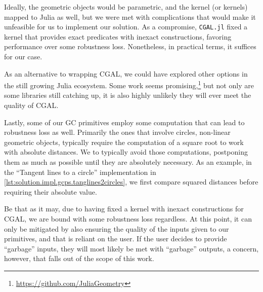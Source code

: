 Ideally, the geometric objects would be parametric, and the kernel (or kernels)
mapped to Julia as well, but we were met with complications that would make it
unfeasible for us to implement our solution.  As a compromise, \texttt{CGAL.jl}
fixed a kernel that provides exact predicates with inexact constructions,
favoring performance over some robustness loss.  Nonetheless, in practical
terms, it suffices for our case.

As an alternative to wrapping \ac{CGAL}, we could have explored other options in
the still growing Julia ecosystem.  Some work seems
promising,\footnote{\url{https://github.com/JuliaGeometry}} but not only are
some libraries still catching up, it is also highly unlikely they will ever meet
the quality of \ac{CGAL}.

Lastly, some of our \ac{GC} primitives employ some computation that can lead to
robustness loss as well.  Primarily the ones that involve circles, non-linear
geometric objects, typically require the computation of a square root to work
with absolute distances.  We to typically avoid those computations, postponing
them as much as possible until they are absolutely necessary.  As an example, in
the ``Tangent lines to a circle'' implementation in
\cref{lst:solution.impl.gcps.tanglines2circles}, we first compare squared
distances before requiring their absolute value.

Be that as it may, due to having fixed a kernel with inexact constructions for
\ac{CGAL}, we are bound with some robustness loss regardless.  At this point, it
can only be mitigated by also ensuring the quality of the inputs given to our
primitives, and that is reliant on the user.  If the user decides to provide
``garbage'' inputs, they will most likely be met with ``garbage'' outputs, a
concern, however, that falls out of the scope of this work.
